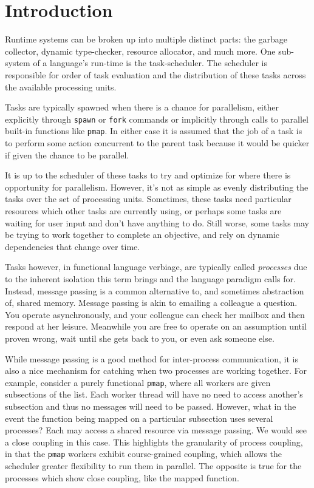 \chapter{Introduction}
%
\label{chap:introduction}

Runtime systems can be broken up into multiple distinct parts: the garbage 
collector, dynamic type-checker, resource allocator, and much more. One 
sub-system of a language's run-time is the task-scheduler. The scheduler is 
responsible for order of task evaluation and the distribution of 
these tasks across the available processing units.

Tasks are typically spawned when there is a chance for parallelism, either 
explicitly through \texttt{spawn} or \texttt{fork} commands or implicitly 
through calls to parallel built-in functions like \texttt{pmap}. In either 
case it is assumed that the job of a task is to perform some action concurrent 
to the parent task because it would be quicker if given the chance to be 
parallel.

It is up to the scheduler of these tasks to try and optimize for where there
is opportunity for parallelism. However, it's not as simple as evenly 
distributing the tasks over the set of processing units. Sometimes, these 
tasks need particular resources which other tasks are currently using,
or perhaps some tasks are waiting for user input and don't have anything to
do. Still worse, some tasks may be trying to work together to complete an 
objective, and rely on dynamic dependencies that change over time.

Tasks however, in functional language verbiage, are typically called 
{\em processes} due to the inherent isolation this term brings and the language 
paradigm calls for. Instead, message passing is a common alternative to, and 
sometimes abstraction of, shared
memory. Message passing is akin to emailing a colleague a question. You operate
asynchronously, and your colleague can check her mailbox and then
respond at her leisure. Meanwhile you are free to operate on an assumption 
until proven wrong, wait until she gets back to you, or even ask someone else.

While message passing is a good method for inter-process communication, it is
also a nice mechanism for catching when two processes are working together.
For example, consider a purely functional \texttt{pmap}, where all 
workers are given subsections of the list. Each worker thread will have no
need to access another's subsection and thus no messages will need to be passed.
However, what in the event the function being mapped on a particular subsection uses 
several processes? Each may access a shared resource via message passing. 
We would see a close coupling in this case.
This highlights the granularity of process coupling, in that the \texttt{pmap}
workers exhibit course-grained coupling, which allows the scheduler greater 
flexibility to run them in parallel. The opposite is true for the processes 
which show close coupling, like the mapped function.

